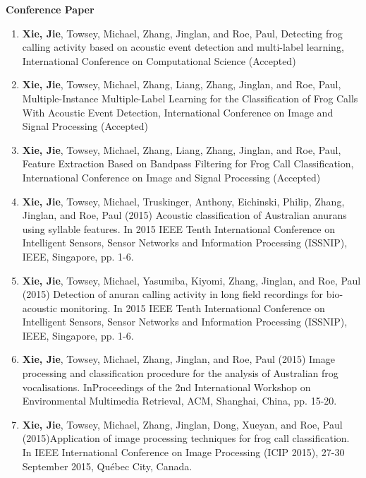 { \large \textbf{Conference Paper}}
\begin{enumerate} 

\item \textbf{Xie, Jie}, Towsey, Michael, Zhang, Jinglan, and Roe, Paul, Detecting frog calling activity based on acoustic event detection and multi-label learning, International Conference on Computational Science (Accepted)
 
 
\item \textbf{Xie, Jie}, Towsey, Michael,  Zhang, Liang, Zhang, Jinglan, and Roe, Paul, Multiple-Instance Multiple-Label Learning for the Classification of Frog Calls With Acoustic Event Detection,  International Conference on Image and Signal Processing (Accepted)
 
 
\item \textbf{Xie, Jie}, Towsey, Michael, Zhang, Liang, Zhang, Jinglan, and Roe, Paul, Feature Extraction Based on Bandpass Filtering for Frog Call Classification, International Conference on Image and Signal Processing (Accepted)



\item	\textbf{Xie, Jie}, Towsey, Michael, Truskinger, Anthony, Eichinski, Philip, Zhang, Jinglan, and Roe, Paul (2015) Acoustic classification of Australian anurans using syllable features. In 2015 IEEE Tenth International Conference on Intelligent Sensors, Sensor Networks and Information Processing (ISSNIP), IEEE, Singapore, pp. 1-6.

\item	\textbf{Xie, Jie}, Towsey, Michael, Yasumiba, Kiyomi, Zhang, Jinglan, and Roe, Paul (2015) Detection of anuran calling activity in long field recordings for bio-acoustic monitoring. In 2015 IEEE Tenth International Conference on Intelligent Sensors, Sensor Networks and Information Processing (ISSNIP), IEEE, Singapore, pp. 1-6.
\item	\textbf{Xie, Jie}, Towsey, Michael, Zhang, Jinglan, and Roe, Paul (2015) Image processing and classification procedure for the analysis of Australian frog vocalisations. InProceedings of the 2nd International Workshop on Environmental Multimedia Retrieval, ACM, Shanghai, China, pp. 15-20.
\item	\textbf{Xie, Jie}, Towsey, Michael, Zhang, Jinglan, Dong, Xueyan, and Roe, Paul (2015)Application of image processing techniques for frog call classification. In IEEE International Conference on Image Processing (ICIP 2015), 27-30 September 2015, Québec City, Canada.


\end{enumerate}
